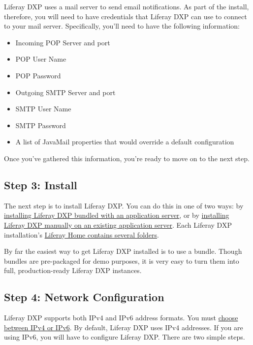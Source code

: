 Liferay DXP uses a mail server to send email notifications. As part of
the install, therefore, you will need to have credentials that Liferay
DXP can use to connect to your mail server. Specifically, you'll need to
have the following information:

\begin{itemize}
\tightlist
\item
  Incoming POP Server and port
\item
  POP User Name
\item
  POP Password
\item
  Outgoing SMTP Server and port
\item
  SMTP User Name
\item
  SMTP Password
\item
  A list of JavaMail properties that would override a default
  configuration
\end{itemize}

Once you've gathered this information, you're ready to move on to the
next step.

\subsection{Step 3: Install}\label{step-3-install}

The next step is to install Liferay DXP. You can do this in one of two
ways: by
\href{/docs/7-1/deploy/-/knowledge_base/d/installing-liferay}{installing
Liferay DXP bundled with an application server}, or by
\href{/docs/7-1/deploy/-/knowledge_base/d/installing-liferay-manually}{installing
Liferay DXP manually on an existing application server}. Each Liferay
DXP installation's
\href{/docs/7-1/deploy/-/knowledge_base/d/installing-liferay\#liferay-home}{Liferay
Home contains several folders}.

By far the easiest way to get Liferay DXP installed is to use a bundle.
Though bundles are pre-packaged for demo purposes, it is very easy to
turn them into full, production-ready Liferay DXP instances.

\subsection{Step 4: Network
Configuration}\label{step-4-network-configuration}

Liferay DXP supports both IPv4 and IPv6 address formats. You must
\href{/docs/7-0/deploy/-/knowledge_base/d/choosing-ipv4-or-ipv6}{choose
between IPv4 or IPv6}. By default, Liferay DXP uses IPv4 addresses. If
you are using IPv6, you will have to configure Liferay DXP. There are
two simple steps.


